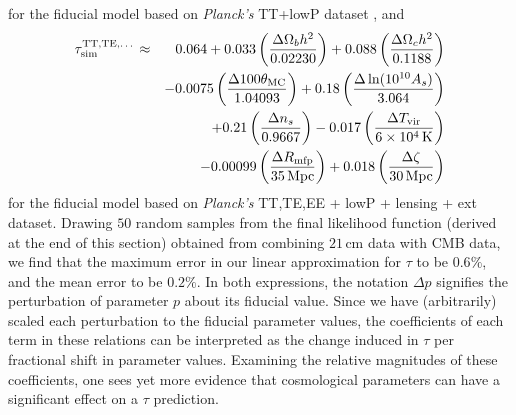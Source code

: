 \documentclass[twocolumn,aps,prd,nofootinbib,showpacs]{revtex4-1}
\begin{document}
for the fiducial model based on \emph{Planck's} TT+lowP dataset , and
\begin{eqnarray}
\label{eq:TTTEEE_linearTau}
\tau_\textrm{sim}^\textrm{TT,TE,\dots} \approx &&\, 0.064 + 0.033  \left(\frac{\Delta\Omega_b h^2}{0.02230}\right) + 0.088\left(\frac{\Delta\Omega_c h^2}{0.1188}\right) \nonumber\\ 
&&  -0.0075 \left(\frac{\Delta100\theta_\textrm{MC}}{1.04093}\right) +   0.18\left(\frac{\Delta\ln (10^{10} A_s)}{3.064}\right)\nonumber \\
&& +   0.21 \left(\frac{\Delta n_s}{0.9667}\right)  -0.017 \left(\frac{\Delta T_\textrm{vir}}{6 \times 10^4\,\textrm{K}}\right)\nonumber \\
&& -0.00099 \left(\frac{\Delta R_\textrm{mfp}}{35\,\textrm{Mpc}}\right) +  0.018 \left(\frac{\Delta \zeta}{30\,\textrm{Mpc}}\right)
\end{eqnarray}
for the fiducial model based on \emph{Planck's} TT,TE,EE + lowP + lensing + ext dataset. Drawing $50$ random samples from the final likelihood function (derived at the end of this section) obtained from combining $21\,\textrm{cm}$ data with CMB data, we find that the maximum error in our linear approximation for $\tau$ to be $0.6\%$, and the mean error to be $0.2\%$. In both expressions, the notation $\Delta p$ signifies the perturbation of parameter $p$ about its fiducial value. Since we have (arbitrarily) scaled each perturbation to the fiducial parameter values, the coefficients of each term in these relations can be interpreted as the change induced in $\tau$ per fractional shift in parameter values. Examining the relative magnitudes of these coefficients, one sees yet more evidence that cosmological parameters can have a significant effect on a $\tau$ prediction.
\end{document}
